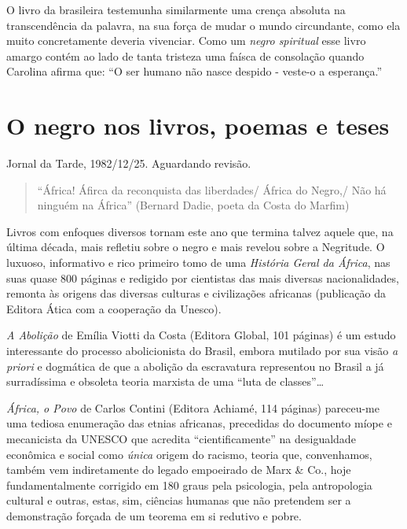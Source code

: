 \documentclass[
  letterpaper,
  DIV=11,
  numbers=noendperiod]{scrreprt}
\begin{document}
O livro da brasileira testemunha similarmente uma crença absoluta na
transcendência da palavra, na sua força de mudar o mundo circundante,
como ela muito concretamente deveria vivenciar. Como um \emph{negro
spiritual} esse livro amargo contém ao lado de tanta tristeza uma faísca
de consolação quando Carolina afirma que: ``O ser humano não nasce
despido - veste-o a esperança.''

\chapter{O negro nos livros, poemas e
teses}\label{o-negro-nos-livros-poemas-e-teses}

Jornal da Tarde, 1982/12/25. Aguardando revisão.

\hfill\break

\begin{quote}
``África! Áfirca da reconquista das liberdades/ África do Negro,/ Não há
ninguém na África'' (Bernard Dadie, poeta da Costa do Marfim)
\end{quote}

Livros com enfoques diversos tornam este ano que termina talvez aquele
que, na última década, mais refletiu sobre o negro e mais revelou sobre
a Negritude. O luxuoso, informativo e rico primeiro tomo de uma
\emph{História Geral da África}, nas suas quase 800 páginas e redigido
por cientistas das mais diversas nacionalidades, remonta às origens das
diversas culturas e civilizações africanas (publicação da Editora Ática
com a cooperação da Unesco).

\emph{A Abolição} de Emília Viotti da Costa (Editora Global, 101
páginas) é um estudo interessante do processo abolicionista do Brasil,
embora mutilado por sua visão \emph{a priori} e dogmática de que a
abolição da escravatura representou no Brasil a já surradíssima e
obsoleta teoria marxista de uma ``luta de classes''\ldots{}

\emph{África, o Povo} de Carlos Contini (Editora Achiamé, 114 páginas)
pareceu-me uma tediosa enumeração das etnias africanas, precedidas do
documento míope e mecanicista da UNESCO que acredita ``cientificamente''
na desigualdade econômica e social como \emph{única} origem do racismo,
teoria que, convenhamos, também vem indiretamente do legado empoeirado
de Marx \& Co., hoje fundamentalmente corrigido em 180 graus pela
psicologia, pela antropologia cultural e outras, estas, sim, ciências
humanas que não pretendem ser a demonstração forçada de um teorema em si
redutivo e pobre.
\end{document}
